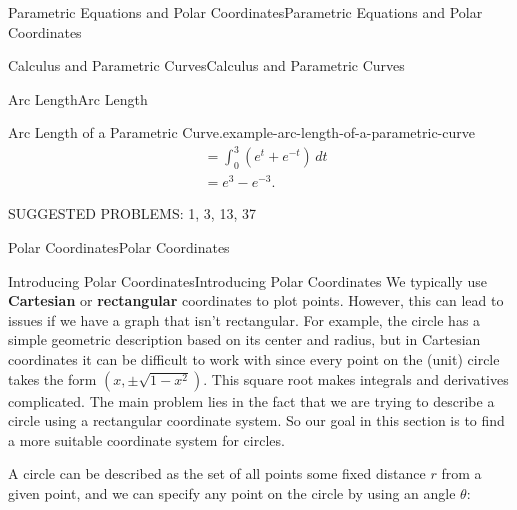 \documentclass[10pt,]{book}
\newcommand{\terminology}[1]{\textbf{#1}}
\numberwithin{equation}{section}
\begin{document}
\begin{chapterptx}{Parametric Equations and Polar Coordinates}{}{Parametric Equations and Polar Coordinates}{}{}
\begin{sectionptx}{Calculus and Parametric Curves}{}{Calculus and Parametric Curves}{}{}
\begin{subsectionptx}{Arc Length}{}{Arc Length}{}{}
\begin{example}{Arc Length of a Parametric Curve.}{example-arc-length-of-a-parametric-curve}
\begin{align*}
& = \int_{0}^{3}(e^{t}+e^{-t})\,dt\\
& = e^{3}-e^{-3}.
\end{align*}
\end{example}
\hypertarget{p-796}{}%
SUGGESTED PROBLEMS: 1, 3, 13, 37%
\end{subsectionptx}
\end{sectionptx}
%
%
\typeout{************************************************}
\typeout{************************************************}
%
\begin{sectionptx}{Polar Coordinates}{}{Polar Coordinates}{}{}\label{section-polar-coordinates}
%
%
\typeout{************************************************}
\typeout{************************************************}
%
\begin{subsectionptx}{Introducing Polar Coordinates}{}{Introducing Polar Coordinates}{}{}\label{subsection-introducing-polar-coordinates}
\hypertarget{p-797}{}%
We typically use \terminology{Cartesian} or \terminology{rectangular} coordinates to plot points. However, this can lead to issues if we have a graph that isn't rectangular. For example, the circle has a simple geometric description based on its center and radius, but in Cartesian coordinates it can be difficult to work with since every point on the (unit) circle takes the form \((x,\pm\sqrt{1-x^{2}})\). This square root makes integrals and derivatives complicated. The main problem lies in the fact that we are trying to describe a circle using a rectangular coordinate system. So our goal in this section is to find a more suitable coordinate system for circles.%
\par
\hypertarget{p-798}{}%
A circle can be described as the set of all points some fixed distance \(r\) from a given point, and we can specify any point on the circle by using an angle \(\theta\):%
\begin{figure}
\centering
{
                }
\end{figure}
\end{subsectionptx}
\end{sectionptx}
\end{chapterptx}
\end{document}
